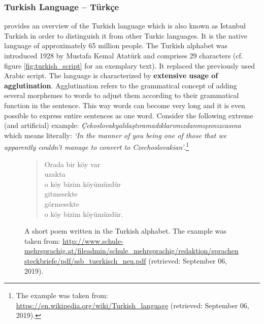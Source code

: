 \subsubsection{Turkish Language -- Türkçe}
\label{sec:turkish_language}

\citep{Karakurt.2006} provides an overview of the Turkish language which is also known as Istanbul Turkish in order to distinguish it from other Turkic languages. It is the native language of approximately 65 million people. The Turkish alphabet was introduced 1928 by Mustafa Kemal Atatürk and comprises 29 characters (cf. figure \vref{fig:turkish_script} for an exemplary text). It replaced the previously used Arabic script. The language is characterized by \textbf{extensive usage of agglutination}. Agglutination refers to the grammatical concept of adding several morphemes to words to adjust them according to their grammatical function in the sentence. This way words can become very long and it is even possible to express entire sentences as one word. Consider the following extreme (and artificial) example: \textit{Çekoslovakyalılaştıramadıklarımızdanmışsınızcasına} which means literally: \textit{`In the manner of you being one of those that we apparently couldn't manage to convert to Czechoslovakian'}.\footnote{The example was taken from: \url{https://en.wikipedia.org/wiki/Turkish_language} (retrieved: September 06, 2019).}

\begin{figure}[h]
	\begin{verse}
		Orada bir köy var \\
		uzakta \\
		o köy bizim köyümüzdür \\
		gitmesekte \\
		görmesekte \\
		o köy bizim köyümüzdür.
	\end{verse}
	\vspace*{-3mm}
	\caption[Poem written in the Turkish alphabet]{A short poem written in the Turkish alphabet. The example was taken from: \url{http://www.schule-mehrsprachig.at/fileadmin/schule_mehrsprachig/redaktion/sprachensteckbriefe/pdf/ssb_tuerkisch_neu.pdf} (retrieved: September 06, 2019).}
	\label{fig:turkish_script}
\end{figure}

